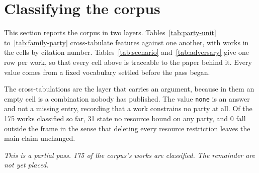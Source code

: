 \section{Classifying the corpus}
\label{sec:tables}

This section reports the corpus in two layers. Tables~\ref{tab:party-unit} to~\ref{tab:family-party} cross-tabulate features against one another, with works in the cells by citation number. Tables~\ref{tab:scenario} and~\ref{tab:adversary} give one row per work, so that every cell above is traceable to the paper behind it. Every value comes from a fixed vocabulary settled before the pass began.

The cross-tabulations are the layer that carries an argument, because in them an empty cell is a combination nobody has published. The value \texttt{none} is an answer and not a missing entry, recording that a work constrains no party at all. Of the 175 works classified so far, 31 state no resource bound on any party, and 0 fall outside the frame in the sense that deleting every resource restriction leaves the main claim unchanged.

\emph{This is a partial pass. 175 of the corpus's works are classified. The remainder are not yet placed.}

